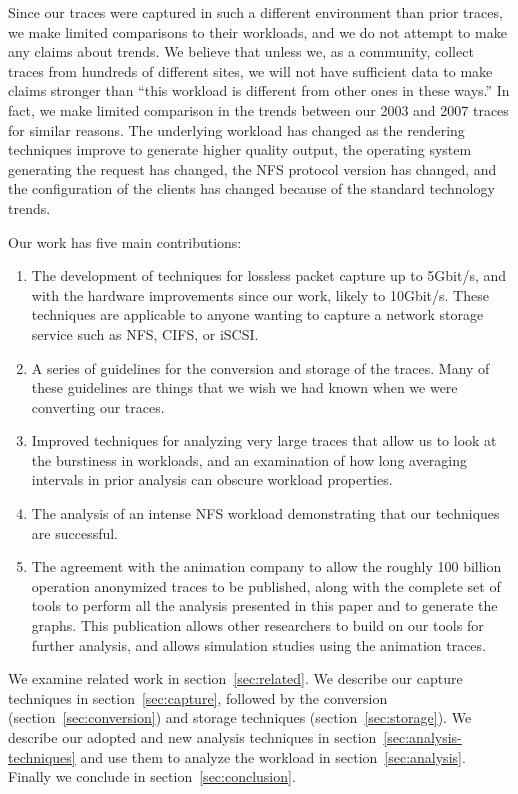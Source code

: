 Since our traces were captured in such a different environment than
prior traces, we make limited comparisons to their workloads, and we
do not attempt to make any claims about trends.  We believe that
unless we, as a community, collect traces from hundreds of different
sites, we will not have sufficient data to make claims stronger than
``this workload is different from other ones in these ways.''  In
fact, we make limited comparison in the trends between our 2003 and
2007 traces for similar reasons.  The underlying workload has changed
as the rendering techniques improve to generate higher quality output,
the operating system generating the request has changed, the NFS
protocol version has changed, and the configuration of the clients has
changed because of the standard technology trends.

Our work has five main contributions:

\begin{enumerate}
\item The development of techniques for lossless packet capture up to
5Gbit/s, and with the hardware improvements since our work, likely to
10Gbit/s.  These techniques are applicable to anyone wanting to capture
a network storage service such as NFS, CIFS, or iSCSI.

\item A series of guidelines for the conversion and storage of the traces.
Many of these guidelines are things that we wish we had known when we
were converting our traces.

\item Improved techniques for analyzing very large traces that allow
us to look at the burstiness in workloads, and an examination of how
long averaging intervals in prior analysis can obscure workload
properties.

\item The analysis of an intense NFS workload demonstrating that our
techniques are successful.

\item The agreement with the animation company to allow the roughly
100 billion operation anonymized traces to be published, along with
the complete set of tools to perform all the analysis presented in
this paper and to generate the graphs.  This publication allows other
researchers to build on our tools for further analysis, and allows
simulation studies using the animation traces.
\end{enumerate}

We examine related work in section~\ref{sec:related}.  We describe our
capture techniques in section~\ref{sec:capture}, followed by the
conversion (section~\ref{sec:conversion}) and storage
techniques (section~\ref{sec:storage}).  We describe our adopted and
new analysis techniques in section~\ref{sec:analysis-techniques} and
use them to analyze the workload in section~\ref{sec:analysis}.
Finally we conclude in section~\ref{sec:conclusion}.
